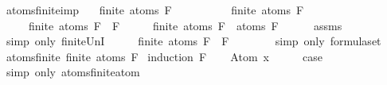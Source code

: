\begin{isabellebody}
\isanewline
%
\endisadelimproof
\isanewline
{}\isamarkupfalse%
\ atoms{\isacharunderscore}finite{\isacharunderscore}imp{\isacharcolon}\isanewline
\ \ \ {\isachardoublequoteopen}finite\ {\isacharparenleft}atoms\ F{}{\isacharparenright}{\isachardoublequoteclose}\isanewline
\ \ \ \ \ \ \ \ \ \ {\isachardoublequoteopen}finite\ {\isacharparenleft}atoms\ F{}{\isacharparenright}{\isachardoublequoteclose}\isanewline
\ \ \ \ \ {\isachardoublequoteopen}finite\ {\isacharparenleft}atoms\ {\isacharparenleft}F{}\ \isactrlbold {\isasymrightarrow}\ F{}{\isacharparenright}{\isacharparenright}{\isachardoublequoteclose}\isanewline
%
\isadelimproof
%
\endisadelimproof
%
\isatagproof
{}\isamarkupfalse%
\ {\isacharminus}\isanewline
\ \ \isamarkupfalse%
\ {\isachardoublequoteopen}finite\ {\isacharparenleft}atoms\ F{}\ {\isasymunion}\ atoms\ F{}{\isacharparenright}{\isachardoublequoteclose}\isanewline
\ \ \ \ \isamarkupfalse%
\ assms\isanewline
\ \ \ \ \isamarkupfalse%
\ {\isacharparenleft}simp\ only{\isacharcolon}\ finite{\isacharunderscore}UnI{\isacharparenright}\isanewline
\ \ \isamarkupfalse%
\ \isamarkupfalse%
\ {\isachardoublequoteopen}finite\ {\isacharparenleft}atoms\ {\isacharparenleft}F{}\ \isactrlbold {\isasymrightarrow}\ F{}{\isacharparenright}{\isacharparenright}{\isachardoublequoteclose}\ \ \isanewline
\ \ \ \ \isamarkupfalse%
\ {\isacharparenleft}simp\ only{\isacharcolon}\ formula{\isachardot}set{\isacharparenleft}{}{\isacharparenright}{\isacharparenright}\isanewline
{}\isamarkupfalse%
%
\endisatagproof
{\isafoldproof}%
%
\isadelimproof
\isanewline
%
\endisadelimproof
\isanewline
{}\isamarkupfalse%
\ atoms{\isacharunderscore}finite{\isacharcolon}\ {\isachardoublequoteopen}finite\ {\isacharparenleft}atoms\ F{\isacharparenright}{\isachardoublequoteclose}\isanewline
%
\isadelimproof
%
\endisadelimproof
%
\isatagproof
{}\isamarkupfalse%
\ {\isacharparenleft}induction\ F{\isacharparenright}\isanewline
\ \ \isamarkupfalse%
\ {\isacharparenleft}Atom\ x{\isacharparenright}\isanewline
\ \ \isamarkupfalse%
\ \isamarkupfalse%
\ {\isacharquery}case\ \isamarkupfalse%
\ {\isacharparenleft}simp\ only{\isacharcolon}\ atoms{\isacharunderscore}finite{\isacharunderscore}atom{\isacharparenright}\isanewline

\end{isabellebody}
